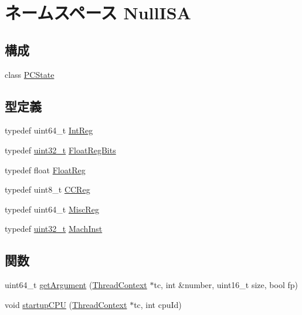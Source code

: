 \hypertarget{namespaceNullISA}{
\section{ネームスペース NullISA}
\label{namespaceNullISA}
}
\subsection*{構成}
\begin{DoxyCompactItemize}
\item 
class \hyperlink{classNullISA_1_1PCState}{PCState}
\end{DoxyCompactItemize}
\subsection*{型定義}
\begin{DoxyCompactItemize}
\item 
typedef uint64\_\-t \hyperlink{namespaceNullISA_a0e080577527fb3e9685399f75b5caf15}{IntReg}
\item 
typedef \hyperlink{Type_8hh_a435d1572bf3f880d55459d9805097f62}{uint32\_\-t} \hyperlink{namespaceNullISA_acc2693113a7cf1a4ff1c9d63b7de6451}{FloatRegBits}
\item 
typedef float \hyperlink{namespaceNullISA_a449d6bb660f5ca613cf359f05d81a20f}{FloatReg}
\item 
typedef uint8\_\-t \hyperlink{namespaceNullISA_a5834599c0196ce4accda8049e7320621}{CCReg}
\item 
typedef uint64\_\-t \hyperlink{namespaceNullISA_aa16539aa6584fd12f7d6fa868f75b4de}{MiscReg}
\item 
typedef \hyperlink{Type_8hh_a435d1572bf3f880d55459d9805097f62}{uint32\_\-t} \hyperlink{namespaceNullISA_a301c22ea09fa33dcfe6ddf22f203699c}{MachInst}
\end{DoxyCompactItemize}
\subsection*{関数}
\begin{DoxyCompactItemize}
\item 
uint64\_\-t \hyperlink{namespaceNullISA_a9f821ddebea7f029e0889ac47e32f84e}{getArgument} (\hyperlink{classThreadContext}{ThreadContext} $\ast$tc, int \&number, uint16\_\-t size, bool fp)
\item 
void \hyperlink{namespaceNullISA_afba1e99c05313c7755d6377ed098e8e1}{startupCPU} (\hyperlink{classThreadContext}{ThreadContext} $\ast$tc, int cpuId)
\end{DoxyCompactItemize}

